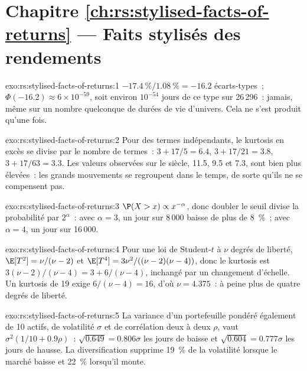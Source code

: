 \section*{Chapitre \ref{ch:rs:stylised-facts-of-returns} --- Faits stylisés des rendements}

\begin{solution}{exo:rs:stylised-facts-of-returns:1}
$-17.4~\%/1.08~\% = -16.2$ écarts-types~; $\Phi(-16.2) \approx 6 \times 10^{-59}$, soit environ $10^{-54}$ jours de ce type sur 26\,296~: jamais, même sur un nombre quelconque
de durées de vie d'univers. Cela ne s'est produit qu'une fois.
\end{solution}

\begin{solution}{exo:rs:stylised-facts-of-returns:2}
Pour des termes indépendants, le kurtosis en excès se divise par le nombre de termes~: $3 + 17/5 = 6.4$, $3 + 17/21 = 3.8$, $3 + 17/63 = 3.3$.
Les valeurs observées sur le siècle, 11.5, 9.5 et 7.3, sont bien plus élevées~: les grands mouvements se regroupent dans le temps, de sorte qu'ils ne se compensent pas.
\end{solution}

\begin{solution}{exo:rs:stylised-facts-of-returns:3}
$\P(X > x) \propto x^{-\alpha}$, donc doubler le seuil divise la probabilité par $2^\alpha$~: avec $\alpha = 3$, un jour sur 8\,000 baisse de
plus de 8~\%~; avec $\alpha = 4$, un jour sur 16\,000.
\end{solution}

\begin{solution}{exo:rs:stylised-facts-of-returns:4}
Pour une loi de Student-$t$ à $\nu$ degrés de liberté, $\E[T^2] = \nu/(\nu - 2)$ et $\E[T^4] = 3\nu^2/((\nu - 2)(\nu - 4))$, donc le kurtosis est
$3(\nu - 2)/(\nu - 4) = 3 + 6/(\nu - 4)$, inchangé par un changement d'échelle. Un kurtosis de 19 exige $6/(\nu - 4) = 16$, d'où $\nu = 4.375$~: à peine plus de
quatre degrés de liberté.
\end{solution}

\begin{solution}{exo:rs:stylised-facts-of-returns:5}
La variance d'un portefeuille pondéré également de 10 actifs, de volatilité $\sigma$ et de corrélation deux à deux $\rho$, vaut $\sigma^2(1/10 +
0.9\rho)$~: $\sqrt{0.649} = 0.806\sigma$ les jours de baisse et $\sqrt{0.604} = 0.777\sigma$ les jours de hausse. La diversification supprime 19~\% de la
volatilité lorsque le marché baisse et 22~\% lorsqu'il monte.
\end{solution}

